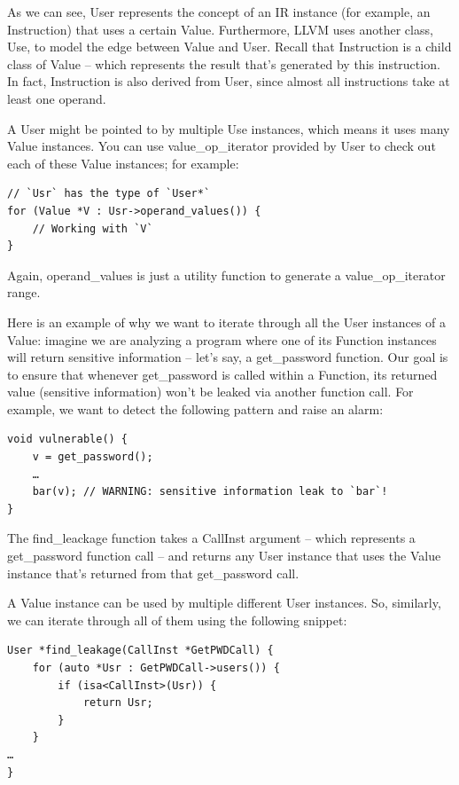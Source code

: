 As we can see, User represents the concept of an IR instance (for example, an Instruction) that uses a certain Value. Furthermore, LLVM uses another class, Use, to model the edge between Value and User. Recall that Instruction is a child class of Value – which represents the result that's generated by this instruction. In fact, Instruction is also derived from User, since almost all instructions take at least one operand.

A User might be pointed to by multiple Use instances, which means it uses many Value instances. You can use value\_op\_iterator provided by User to check out each of these Value instances; for example:

\begin{lstlisting}[style=styleCXX]
// `Usr` has the type of `User*`
for (Value *V : Usr->operand_values()) {
	// Working with `V`
}
\end{lstlisting}

Again, operand\_values is just a utility function to generate a value\_op\_iterator range.

Here is an example of why we want to iterate through all the User instances of a Value: imagine we are analyzing a program where one of its Function instances will return sensitive information – let's say, a get\_password function. Our goal is to ensure that whenever get\_password is called within a Function, its returned value (sensitive information) won't be leaked via another function call. For example, we want to detect the following pattern and raise an alarm:

\begin{lstlisting}[style=styleCXX]
void vulnerable() {
	v = get_password();
	…
	bar(v); // WARNING: sensitive information leak to `bar`!
}
\end{lstlisting}

The find\_leackage function takes a CallInst argument – which represents a get\_password function call – and returns any User instance that uses the Value instance that's returned from that get\_password call. 

A Value instance can be used by multiple different User instances. So, similarly, we can iterate through all of them using the following snippet:

\begin{lstlisting}[style=styleCXX]
User *find_leakage(CallInst *GetPWDCall) {
	for (auto *Usr : GetPWDCall->users()) {
		if (isa<CallInst>(Usr)) {
			return Usr;
		}
	}
…
}
\end{lstlisting}

